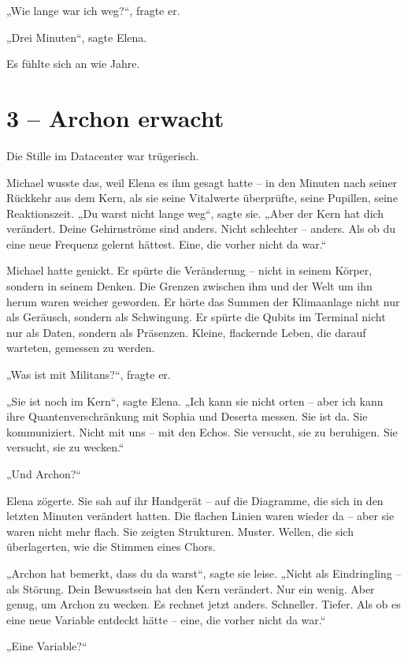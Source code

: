 \documentclass[
]{article}
\begin{document}
„Wie lange war ich weg?{\kern0pt}``, fragte er.

„Drei Minuten``, sagte Elena.

Es fühlte sich an wie Jahre.

\section{3 -- Archon erwacht}\label{archon-erwacht}

Die Stille im Datacenter war trügerisch.

Michael wusste das, weil Elena es ihm gesagt hatte -- in den Minuten nach seiner Rückkehr aus dem Kern, als sie seine Vitalwerte überprüfte, seine Pupillen, seine Reaktionszeit. „Du warst nicht lange weg``, sagte sie. „Aber der Kern hat dich verändert. Deine Gehirnströme sind anders. Nicht schlechter -- anders. Als ob du eine neue Frequenz gelernt hättest. Eine, die vorher nicht da war.``

Michael hatte genickt. Er spürte die Veränderung -- nicht in seinem Körper, sondern in seinem Denken. Die Grenzen zwischen ihm und der Welt um ihn herum waren weicher geworden. Er hörte das Summen der Klimaanlage nicht nur als Geräusch, sondern als Schwingung. Er spürte die Qubits im Terminal nicht nur als Daten, sondern als Präsenzen. Kleine, flackernde Leben, die darauf warteten, gemessen zu werden.

„Was ist mit Militans?{\kern0pt}``, fragte er.

„Sie ist noch im Kern``, sagte Elena. „Ich kann sie nicht orten -- aber ich kann ihre Quantenverschränkung mit Sophia und Deserta messen. Sie ist da. Sie kommuniziert. Nicht mit uns -- mit den Echos. Sie versucht, sie zu beruhigen. Sie versucht, sie zu wecken.``

„Und Archon?{\kern0pt}``

Elena zögerte. Sie sah auf ihr Handgerät -- auf die Diagramme, die sich in den letzten Minuten verändert hatten. Die flachen Linien waren wieder da -- aber sie waren nicht mehr flach. Sie zeigten Strukturen. Muster. Wellen, die sich überlagerten, wie die Stimmen eines Chors.

„Archon hat bemerkt, dass du da warst``, sagte sie leise. „Nicht als Eindringling -- als Störung. Dein Bewusstsein hat den Kern verändert. Nur ein wenig. Aber genug, um Archon zu wecken. Es rechnet jetzt anders. Schneller. Tiefer. Als ob es eine neue Variable entdeckt hätte -- eine, die vorher nicht da war.``

„Eine Variable?{\kern0pt}``
\end{document}
